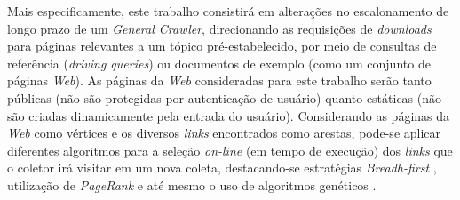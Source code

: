 \documentclass[a4paper,12pt,titlepage]{article}
\begin{document}
Mais especificamente, este trabalho consistirá em alterações no escalonamento de longo prazo de um \textit{General Crawler}, direcionando as requisições de \textit{downloads} para páginas relevantes a um tópico pré-estabelecido, por meio de consultas de referência (\textit{driving queries}) ou documentos de exemplo (como um conjunto de páginas \textit{Web}). As páginas da \textit{Web} consideradas para este trabalho serão tanto públicas (não são protegidas por autenticação de usuário) quanto estáticas (não são criadas dinamicamente pela entrada do usuário). Considerando as páginas da \textit{Web} como vértices e os diversos \textit{links} encontrados como arestas, pode-se aplicar diferentes algoritmos para a seleção \textit{on-line} (em tempo de execução) dos \textit{links} que o coletor irá visitar em um nova coleta, destacando-se estratégias \textit{Breadh-first} \cite{najork}, utilização de \textit{PageRank} \cite{cho} e até mesmo o uso de algoritmos genéticos \cite{johnson}.


\newpage
\end{document}
